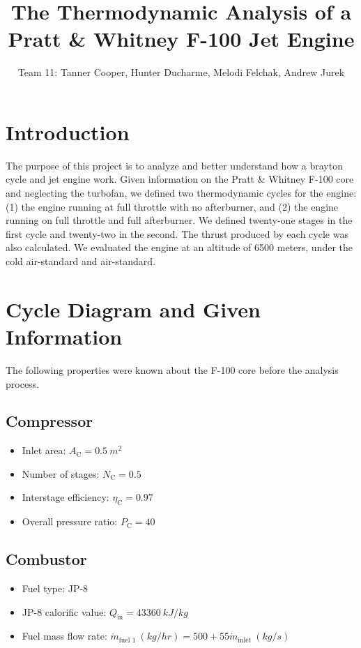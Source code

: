 \documentclass[11pt]{article} %
\title{The Thermodynamic Analysis of a Pratt \& Whitney F-100 Jet Engine}
\author{Team 11: Tanner Cooper, Hunter Ducharme, Melodi Felchak, Andrew Jurek}
\date{} %
\begin{document}
\maketitle

\section{Introduction}

The purpose of this project is to analyze and better understand how a brayton cycle and jet engine work. Given information on the Pratt \& Whitney F-100 core and neglecting the turbofan, we defined two thermodynamic cycles for the engine: (1) the engine running at full throttle with no afterburner, and (2) the engine running on full throttle and full afterburner. We defined twenty-one stages in the first cycle and twenty-two in the second. The thrust produced by each cycle was also calculated. We evaluated the engine at an altitude of 6500 meters, under the cold air-standard and air-standard.

\section{Cycle Diagram and Given Information}
The following properties were known about the F-100 core before the analysis process.

\subsection{Compressor}
\begin{itemize}
\item Inlet area: $A_{\text{C}} = 0.5\ \si{m^{2}}$
\item Number of stages: $N_{\text{C}} = 0.5$
\item Interstage efficiency: $\eta_{\text{C}} = 0.97$
\item Overall pressure ratio: $P_{\text{C}} = 40$
\end{itemize}

\subsection{Combustor}
\begin{itemize}
\item Fuel type: JP-8
\item JP-8 calorific value: $Q_{\text{in}} = 43360\ \si{kJ/kg}$
\item Fuel mass flow rate: $\dot m_{\text{fuel 1}}\ (\si{kg/hr}) = 500 + 55 \dot m_{\text{inlet}}\ (\si{kg/s})$
\end{itemize}
\end{document}
